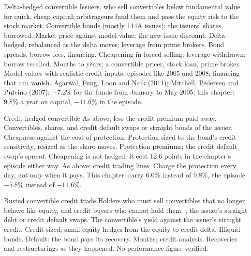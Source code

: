 \begin{strategyfile}{Delta-hedged convertible}\label{strat:s2:convertible-arbitrage:delta}
 Issuers, who sell convertibles below fundamental value for quick, cheap capital; arbitrageurs fund them and pass the
equity risk to the stock market.
 Convertible bonds (mostly 144A issues); the issuers' shares, borrowed.
 Market price against model value; the new-issue discount.
 Delta-hedged, rebalanced as the delta moves; leverage from prime brokers.
 Bond spreads, borrow fees, financing.
 Cheapening in forced selling; leverage withdrawn; borrow recalled.
 Months to years; a convertible pricer, stock loan, prime broker.
 Model values with realistic credit inputs; episodes like 2005 and 2008; financing that can vanish.
 Agarwal, Fung, Loon and Naik (2011); Mitchell, Pedersen and Pulvino (2007): $-7.2\%$ for the funds from January to May 2005; this
chapter: 9.8\% a year on capital, $-11.6\%$ in the episode.
\end{strategyfile}

\begin{strategyfile}{Credit-hedged convertible}\label{strat:s2:convertible-arbitrage:credit}
 As above, less the credit premium paid away.
 Convertibles, shares, and credit default swaps or straight bonds of the issuer.
 Cheapness against the cost of protection.
 Protection sized to the bond's credit sensitivity, resized as the share moves.
 Protection premiums; the credit default swap's spread.
 Cheapening is not hedged: it cost 12.6 points in the chapter's episode either way.
 As above; credit trading lines.
 Charge the protection every day, not only when it pays.
 This chapter: carry 6.0\% instead of 9.8\%, the episode $-5.8\%$ instead of $-11.6\%$.
\end{strategyfile}

\begin{strategyfile}{Busted convertible credit trade}\label{strat:s2:convertible-arbitrage:busted}
 Holders who must sell convertibles that no longer behave like equity, and credit buyers who cannot hold them.
 ; the issuer's straight debt or credit default swaps.
 The convertible's yield against the issuer's straight credit.
 Credit-sized; small equity hedges from the equity-to-credit delta.
 Illiquid bonds.
 Default: the bond pays its recovery.
 Months; credit analysis.
 Recoveries and restructurings as they happened.
 No performance figure verified.
\end{strategyfile}

